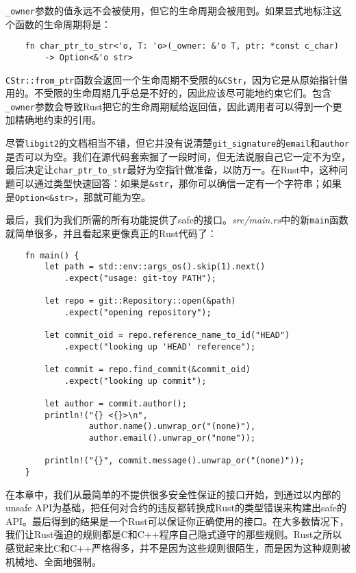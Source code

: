\texttt{\_owner}参数的值永远不会被使用，但它的生命周期会被用到。如果显式地标注这个函数的生命周期将是：
\begin{verbatim}
    fn char_ptr_to_str<'o, T: 'o>(_owner: &'o T, ptr: *const c_char)
        -> Option<&'o str>
\end{verbatim}

\texttt{CStr::from\_ptr}函数会返回一个生命周期不受限的\texttt{\&CStr}，因为它是从原始指针借用的。不受限的生命周期几乎总是不好的，因此应该尽可能地约束它们。包含\texttt{\_owner}参数会导致Rust把它的生命周期赋给返回值，因此调用者可以得到一个更加精确地约束的引用。

尽管\texttt{libgit2}的文档相当不错，但它并没有说清楚\texttt{git\_signature}的\texttt{email}和\texttt{author}是否可以为空。我们在源代码套索掘了一段时间，但无法说服自己它一定不为空，最后决定让\texttt{char\_ptr\_to\_str}最好为空指针做准备，以防万一。在Rust中，这种问题可以通过类型快速回答：如果是\texttt{\&str}，那你可以确信一定有一个字符串；如果是\texttt{Option<\&str>}，那就可能为空。

最后，我们为我们所需的所有功能提供了safe的接口。\emph{src/main.rs}中的新\texttt{main}函数就简单很多，并且看起来更像真正的Rust代码了：
\begin{verbatim}
    fn main() {
        let path = std::env::args_os().skip(1).next()
            .expect("usage: git-toy PATH");

        let repo = git::Repository::open(&path)
            .expect("opening repository");
        
        let commit_oid = repo.reference_name_to_id("HEAD")
            .expect("looking up 'HEAD' reference");
        
        let commit = repo.find_commit(&commit_oid)
            .expect("looking up commit");
        
        let author = commit.author();
        println!("{} <{}>\n",
                 author.name().unwrap_or("(none)"),
                 author.email().unwrap_or("none"));
        
        println!("{}", commit.message().unwrap_or("(none)"));
    }
\end{verbatim}

在本章中，我们从最简单的不提供很多安全性保证的接口开始，到通过以内部的unsafe API为基础，把任何对合约的违反都转换成Rust的类型错误来构建出safe的API。最后得到的结果是一个Rust可以保证你正确使用的接口。在大多数情况下，我们让Rust强迫的规则都是C和C++程序自己隐式遵守的那些规则。Rust之所以感觉起来比C和C++严格得多，并不是因为这些规则很陌生，而是因为这种规则被机械地、全面地强制。

